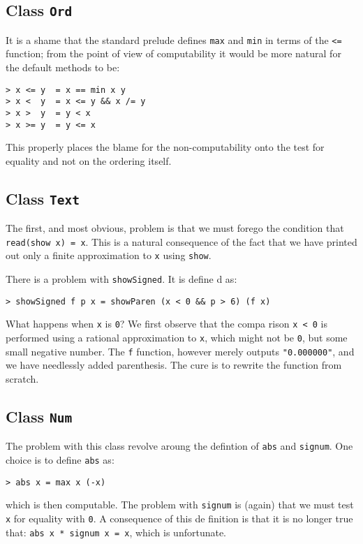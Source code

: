 \subsection{Class \mbox{\tt Ord}}

It is a shame that the standard prelude defines \mbox{\tt max} and
 \mbox{\tt min} in
terms of the \mbox{\tt <=} function; from the point of view of computability it
would be more natural for the default methods to be:
\begin{verbatim}
> x <= y  = x == min x y
> x <  y  = x <= y && x /= y
> x >  y  = y < x
> x >= y  = y <= x
\end{verbatim}
This properly places the blame for the non-computability onto the test
for equality and not on the ordering itself.

\subsection{Class \mbox{\tt Text}}

The first, and most obvious, problem is that we must forego the
condition that \mbox{\tt read(show\ x)\ =\ x}. This is a natural consequence of
the fact that we have printed out only a finite approximation to \mbox{\tt x}
using \mbox{\tt show}.

There is a problem with \mbox{\tt showSigned}. It is define
d as:
\begin{verbatim}
> showSigned f p x = showParen (x < 0 && p > 6) (f x)
\end{verbatim}
%
What happens when \mbox{\tt x} is \mbox{\tt 0}? We first observe that the compa
rison
\mbox{\tt x\ <\ 0} is performed using a rational approximation to \mbox{\tt x},
 which might
not be \mbox{\tt 0}, but some small negative number. The \mbox{\tt f} function,
 however
merely outputs \mbox{\tt "0.000000"}, and we have needlessly added
parenthesis. The cure is to rewrite the function from scratch.

\subsection{Class \mbox{\tt Num}}

The problem with this class revolve aroung the defintion of \mbox{\tt abs} and
\mbox{\tt signum}. One choice is to define \mbox{\tt abs} as:
\begin{verbatim}
> abs x = max x (-x)
\end{verbatim}
%
which is then computable. The problem with \mbox{\tt signum} is
 (again) that we
must test \mbox{\tt x} for equality with \mbox{\tt 0}. A consequence of this de
finition
is that it is no longer true that: \mbox{\tt abs\ x\ *\ signum\ x\ =\ x}, which
 is
unfortunate.

